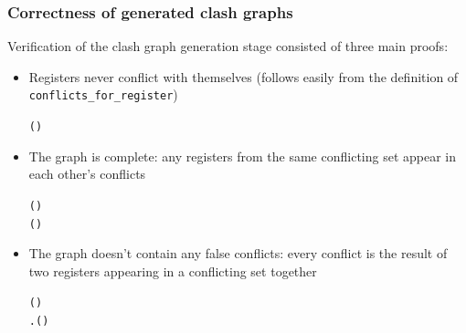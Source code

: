 \documentclass{beamer}
\begin{document}
\begin{frame}[containsverbatim]
\frametitle{Correctness of generated clash graphs}
Verification of the clash graph generation stage consisted of three main proofs:

\begin{itemize}
	\item Registers never conflict with themselves (follows easily from the definition of \texttt{conflicts\_for\_register})

	\begin{alltt}\small
		\HOLTokenTurnstile{}  \HOLTokenNotIn{}  (   )
	\end{alltt}

	\item The graph is complete: any registers from the same conflicting set appear in each other's conflicts

	\begin{alltt}\small
		\HOLTokenTurnstile{}   (  ) \HOLTokenConj{}    \HOLTokenConj{}    \HOLTokenConj{}
    \HOLTokenNotEqual{}  \HOLTokenImp{}
     (   )
	\end{alltt}
\end{itemize}
\end{frame}

\begin{frame}[containsverbatim]
\begin{itemize}
	\item The graph doesn't contain any false conflicts: every conflict is the result of two registers appearing in a conflicting set together

	\begin{alltt}\small
		\HOLTokenTurnstile{}   (   ) \HOLTokenImp{}
   \HOLTokenExists{}.   (  ) \HOLTokenConj{}    \HOLTokenConj{}   
	\end{alltt}
\end{itemize}
\end{frame}
\end{document}
